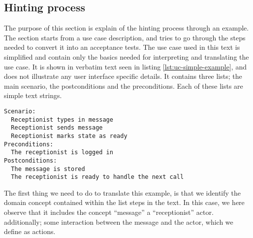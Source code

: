 \subsection{Hinting process}
The purpose of this section is explain of the hinting process through an example. The section starts from a use case description, and tries to go through the steps needed to convert it into an acceptance tests. The use case used in this text is simplified and contain only the basics needed for interpreting and translating the use case. It is shown in verbatim text seen in listing \ref{lst:uc-simple-example}, and does not illustrate any user interface specific details. It contains three lists; the main scenario, the postconditions and the preconditions. Each of these lists are simple text strings.

\begin{lstlisting}[frame=single,style=usecase, caption=Use case example, label=lst:uc-simple-example]
Scenario:
  Receptionist types in message
  Receptionist sends message
  Receptionist marks state as ready 
Preconditions:
  The receptionist is logged in
Postconditions:
  The message is stored
  The receptionist is ready to handle the next call
\end{lstlisting}
The first thing we need to do to translate this example, is that we identify the domain concept contained within the list steps in the text. In this case, we here observe that it includes the concept ``message'' a ``receptionist'' actor. additionally; some interaction between the message and the actor, which we define as actions.\medskip

